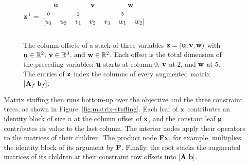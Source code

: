 \begin{figure}[htbp]
\centering
$
\mvec{z}^\top =
\begin{blockarray}{ccccccc}
\multicolumn{2}{c}{$\mvec{u}$} & \multicolumn{3}{c}{$\mvec{v}$} & \multicolumn{2}{c}{$\mvec{w}$} \\
\scriptstyle 0 & & \scriptstyle 2 & & & \scriptstyle 5 & \\
\begin{block}{[ccccccc]}
u_1 & u_2 & v_1 & v_2 & v_3 & w_1 & w_2 \\
\end{block}
\end{blockarray}
$
\caption{The column offsets of a stack of three variables
$\mathbf{z} = (\mathbf{u}, \mathbf{v}, \mathbf{w})$ with $\mathbf{u} \in \mathbb{R}^2$,
$\mathbf{v} \in \mathbb{R}^3$, and $\mathbf{w} \in \mathbb{R}^2$. Each offset is the total dimension of
the preceding variables: $\mathbf{u}$ starts at column $0$, $\mathbf{v}$ at $2$, and $\mathbf{w}$
at $5$. The entries of $\mathbf{z}$ index the columns of every augmented matrix
$[\mathbf{A}_f\ \mathbf{b}_f]$.}
\label{fig:column-offsets}
\end{figure}

Matrix stuffing then runs bottom-up over the objective and the three constraint trees, as
shown in Figure~\ref{fig:matrix-stuffing}. Each leaf of $\mathbf{x}$
contributes an identity block of size $n$ at the column offset of $\mathbf{x}$, and the constant
leaf $\mathbf{g}$ contributes its value to the last column. The interior nodes apply their
operators to the matrices of their children. The product node $\mathbf{F}\mathbf{x}$, for example,
multiplies the identity block of its argument by $\mathbf{F}$. Finally, the root stacks the
augmented matrices of its children at their constraint row offsets into $[\mathbf{A}\ \mathbf{b}]$.

